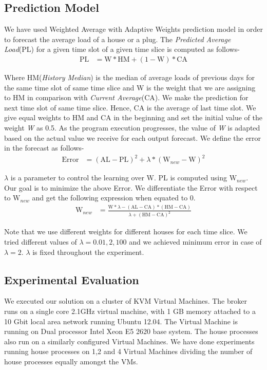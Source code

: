 \subsection{Prediction Model}
We have used Weighted Average with Adaptive Weights prediction model in order to forecast the average load of a house or a plug.
The \textit{Predicted Average Load}(PL) for a given time slot of a given time slice is computed as follows-
\begin{align*}
\mbox{PL} &= \mbox{W}*\mbox{HM}  + (1-\mbox{W})*\mbox{CA}
\end{align*}

\noindent Where HM(\textit{History Median}) is the median of average loads of previous days for the same time slot of same time slice and W is the weight that we are assigning to HM in comparison with \textit{Current Average}(CA).
We make the prediction for next time slot of same time slice.
Hence, CA is the average of last time slot.
We give equal weights to HM and CA in the beginning and set the initial value of the weight \textit{W} as 0.5.
As the program execution progresses, the value of \textit{W} is adapted based on the actual value we receive for each output forecast.
We define the error in the forecast as follows-
\begin{align*}
\mbox{Error} &= (\mbox{AL} - \mbox{PL})^2 + \lambda * (\mbox{W}_{new} - \mbox{W})^2
\end{align*}

\noindent $\lambda$ is a parameter to control the learning over W.
PL is computed using $\mbox{W}_{new}$.
Our goal is to minimize the above Error.
We differentiate the Error with respect to $\mbox{W}_{new}$ and get the following expression when equated to 0.
\begin{align*}
\mbox{W}_{new} &= \frac{\mbox{W}*\lambda-(\mbox{AL}-\mbox{CA}) * (\mbox{HM}-\mbox{CA})}{\lambda + (\mbox{HM}-\mbox{CA})^2}
\end{align*}

Note that we use different weights for different houses for each time slice.
We tried different values of $\lambda=0.01, 2, 100$ and we achieved minimum error in case of $\lambda = 2$.
$\lambda$ is fixed throughout the experiment.

\subsection{Experimental Evaluation}
We executed our solution on a cluster of KVM \cite{kvm}  Virtual Machines.
The broker runs on a single core 2.1GHz virtual machine, with 1 GB memory attached to a 10 Gbit local area network running Ubuntu 12.04.
The Virtual Machine is running on Dual processor Intel Xeon E5 2620 base system.
The house processes also run on a similarly configured Virtual Machines.
We have done experiments running house processes on 1,2 and 4 Virtual Machines dividing the number of house processes equally amongst the VMs.

